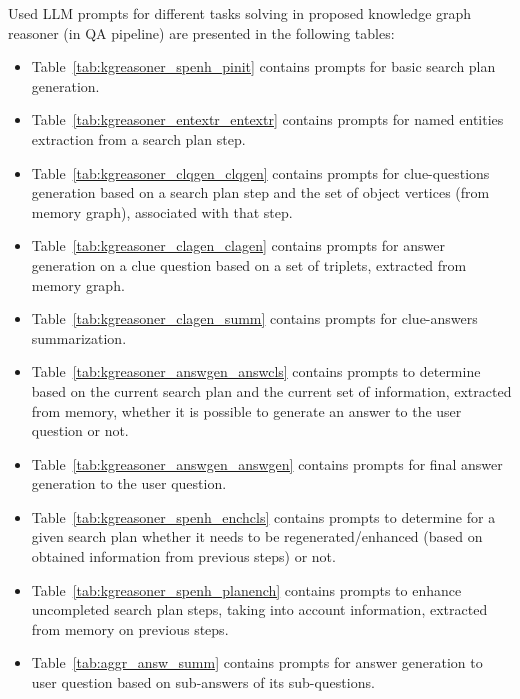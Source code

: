 Used LLM prompts for different tasks solving in proposed knowledge graph reasoner (in QA pipeline) are presented in the following tables:
\begin{itemize}
    \item Table~\ref{tab:kgreasoner_spenh_pinit} contains prompts for basic search plan generation.
    \item Table~\ref{tab:kgreasoner_entextr_entextr} contains prompts for named entities extraction from a search plan step.
    \item Table~\ref{tab:kgreasoner_clqgen_clqgen} contains prompts for clue-questions generation based on a search plan step and the set of object vertices (from memory graph), associated with that step.
    \item Table~\ref{tab:kgreasoner_clagen_clagen} contains prompts for answer generation on a clue question based on a set of triplets, extracted from memory graph.
    \item Table~\ref{tab:kgreasoner_clagen_summ} contains prompts for clue-answers summarization.
    \item Table~\ref{tab:kgreasoner_answgen_answcls} contains prompts to determine based on the current search plan and the current set of information, extracted from memory, whether it is possible to generate an answer to the user question or not.
    \item Table~\ref{tab:kgreasoner_answgen_answgen} contains prompts for final answer generation to the user question.
    \item Table~\ref{tab:kgreasoner_spenh_enchcls} contains prompts to determine for a given search plan whether it needs to be regenerated/enhanced (based on obtained information from previous steps) or not.
    \item Table~\ref{tab:kgreasoner_spenh_planench} contains prompts to enhance uncompleted search plan steps, taking into account information, extracted from memory on previous steps.
    \item Table~\ref{tab:aggr_answ_summ} contains prompts for answer generation to user question based on sub-answers of its sub-questions.
\end{itemize}

